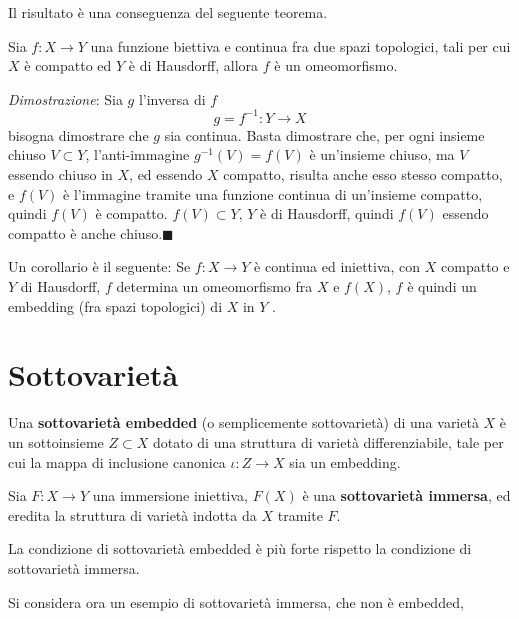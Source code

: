 \documentclass[10pt, letterpaper]{report}
\begin{document}
\noindent Il risultato è una conseguenza del seguente teorema.
\begin{teorema}
    Sia $f:X\rightarrow Y$ una funzione biettiva e continua fra due spazi topologici, tali per cui $X$ è compatto ed $Y$ è di Hausdorff, allora $f$ è un omeomorfismo.
\end{teorema}
\textit{Dimostrazione}: Sia $g$ l'inversa di $f$\begin{equation}
    g=f^{-1}:Y\rightarrow X 
\end{equation}
bisogna dimostrare che $g$ sia continua. Basta dimostrare che, per ogni insieme chiuso $V\subset Y$, l'anti-immagine  $g^{-1}(V)=f(V)$ è un'insieme chiuso, ma $V$ essendo chiuso in $X$, ed essendo $X$ compatto, risulta anche esso stesso compatto, e $f(V)$ è l'immagine tramite una funzione continua di un'insieme compatto, quindi $f(V)$ è compatto. $f(V)\subset Y$, $Y$ è di Hausdorff, quindi $f(V)$ essendo compatto è anche chiuso.\hfill$\blacksquare$\bigskip

\noindent 
Un corollario è il seguente: Se $f:X\rightarrow Y$ è continua ed iniettiva, con $X$  compatto e $Y$  di Hausdorff, $f$ determina un omeomorfismo fra $X$ e $f(X)$, $f$ è quindi un embedding (fra spazi topologici) di $X$ in $Y$ .
\section{Sottovarietà}
\begin{definizione}
    Una \textbf{sottovarietà embedded} (o semplicemente sottovarietà) di una varietà $X$ è un sottoinsieme $Z\subset X$ dotato di una struttura di varietà differenziabile, tale per cui la mappa di inclusione canonica $\iota:Z\rightarrow X$ sia un embedding.
\end{definizione}
\begin{definizione}
    Sia $F:X\rightarrow Y$ una immersione iniettiva, $F(X)$ è una \textbf{sottovarietà immersa}, ed eredita la struttura di varietà indotta da $X$ tramite $F$.
\end{definizione}
La condizione di sottovarietà embedded è più forte rispetto la condizione di sottovarietà immersa.\bigskip

\noindent Si considera ora un esempio di sottovarietà immersa, che non è embedded,
\end{document}
